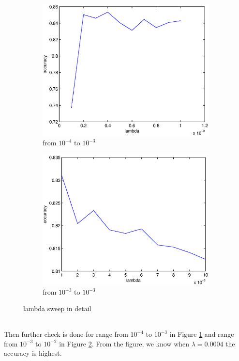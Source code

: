\documentclass[12pt]{article}
\begin{document}
	\begin{figure}
		\begin{subfigure}{.5\textwidth}
			\centering
			\includegraphics[width=.9\linewidth]{lambda_n4ton3}
			\caption{from $10^{-4}$ to $10^{-3}$}
			\label{fig:lambda4to3}
		\end{subfigure}%
		\begin{subfigure}{.5\textwidth}
			\centering
			\includegraphics[width=.9\linewidth]{lambda_n3ton2}
			\caption{from $10^{-3}$ to $10^{-3}$}
			\label{fig:lambda3to2}
		\end{subfigure}
		\caption{lambda sweep in detail}
		\label{fig:fig}
	\end{figure}
	\\
	\noindent
	Then further check is done for range from $10^{-4}$ to $10^{-3}$ in Figure \ref{fig:lambda4to3} and range from $10^{-3}$ to $10^{-2}$ in Figure \ref{fig:lambda3to2}. From the figure, we know when $\lambda=0.0004$ the accuracy is highest.\\
\end{document}
